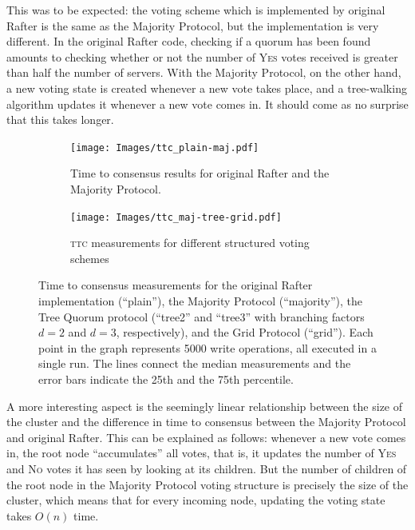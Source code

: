 \documentclass[12pt,chapterprefix=true,toc=bibliography,numbers=noendperiod,
               footnotes=multiple,twoside]{scrreprt}
\newcommand{\yes}{{\fontfamily{jkposn}\selectfont\textsc{Yes}}}
\newcommand{\no}{{\fontfamily{jkposn}\selectfont\textsc{No}}}
\begin{document}
This was to be expected: the voting scheme which is implemented by original Rafter is the same as the Majority Protocol, but the implementation is very different. In the original Rafter code, checking if a quorum has been found amounts to checking whether or not the number of \yes{} votes received is greater than half the number of servers. With the Majority Protocol, on the other hand, a new voting state is created whenever a new vote takes place, and a tree-walking algorithm updates it whenever a new vote comes in. It should come as no surprise that this takes longer.

\begin{figure}[p]
    \begin{subfigure}{1\textwidth}
        \centering
        \texttt{[image: Images/ttc\_plain-maj.pdf]}
        \caption{Time to consensus results for original Rafter and the Majority Protocol.}
        \label{fig:plain-maj-ttc}
    \end{subfigure}

    \begin{subfigure}{1\textwidth}
        \centering
        \texttt{[image: Images/ttc\_maj-tree-grid.pdf]}
        \caption{\textsc{ttc} measurements for different structured voting schemes}
        \label{fig:maj-tree-grid-ttc}
    \end{subfigure}
    \caption{Time to consensus measurements for the original Rafter implementation (\enquote{plain}), the Majority Protocol (\enquote{majority}), the Tree Quorum protocol (\enquote{tree2} and \enquote{tree3} with branching factors \(d = 2\) and \(d = 3\), respectively), and the Grid Protocol (\enquote{grid}). Each point in the graph represents 5000 write operations, all executed in a single run. The lines connect the median measurements and the error bars indicate the 25th and the 75th percentile.}
    \label{fig:ttc}
\end{figure}

A more interesting aspect is the seemingly linear relationship between the size of the cluster and the difference in time to consensus between the Majority Protocol and original Rafter. This can be explained as follows: whenever a new vote comes in, the root node \enquote{accumulates} all votes, that is, it updates the number of \yes{} and \no{} votes it has seen by looking at its children. But the number of children of the root node in the Majority Protocol voting structure is precisely the size of the cluster, which means that for every incoming node, updating the voting state takes \(O(n)\) time.
\end{document}
